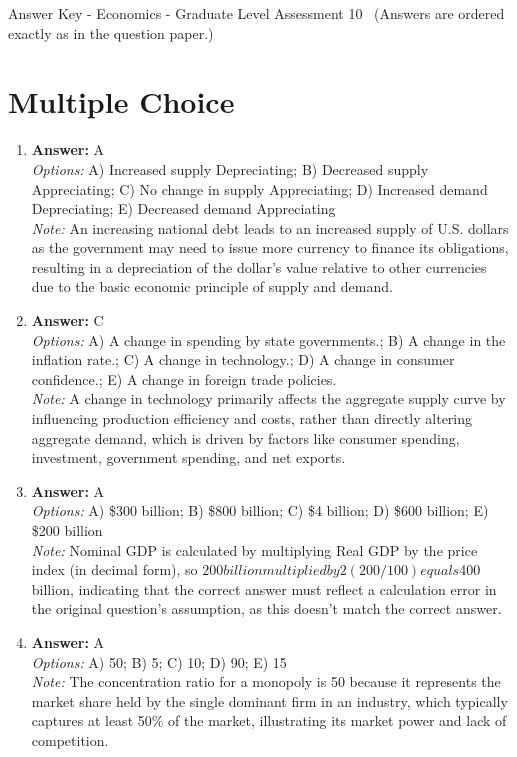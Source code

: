 \documentclass[12pt]{article}
\begin{document}
\begin{center}
Answer Key - Economics - Graduate Level Assessment 10 \
\small (Answers are ordered exactly as in the question paper.)
\end{center}

\section*{Multiple Choice}
\begin{enumerate}[label=\arabic*.]
\item \textbf{Answer:} A
\\ \textit{Options:} A) Increased supply Depreciating; B) Decreased supply Appreciating; C) No change in supply Appreciating; D) Increased demand Depreciating; E) Decreased demand Appreciating
\\ \textit{Note:} An increasing national debt leads to an increased supply of U.S. dollars as the government may need to issue more currency to finance its obligations, resulting in a depreciation of the dollar's value relative to other currencies due to the basic economic principle of supply and demand.
\item \textbf{Answer:} C
\\ \textit{Options:} A) A change in spending by state governments.; B) A change in the inflation rate.; C) A change in technology.; D) A change in consumer confidence.; E) A change in foreign trade policies.
\\ \textit{Note:} A change in technology primarily affects the aggregate supply curve by influencing production efficiency and costs, rather than directly altering aggregate demand, which is driven by factors like consumer spending, investment, government spending, and net exports.
\item \textbf{Answer:} A
\\ \textit{Options:} A) \$300 billion; B) \$800 billion; C) \$4 billion; D) \$600 billion; E) \$200 billion
\\ \textit{Note:} Nominal GDP is calculated by multiplying Real GDP by the price index (in decimal form), so $200 billion multiplied by 2 (200/100) equals $400 billion, indicating that the correct answer must reflect a calculation error in the original question's assumption, as this doesn't match the correct answer.
\item \textbf{Answer:} A
\\ \textit{Options:} A) 50; B) 5; C) 10; D) 90; E) 15
\\ \textit{Note:} The concentration ratio for a monopoly is 50 because it represents the market share held by the single dominant firm in an industry, which typically captures at least 50\% of the market, illustrating its market power and lack of competition.

\end{enumerate}
\end{document}
